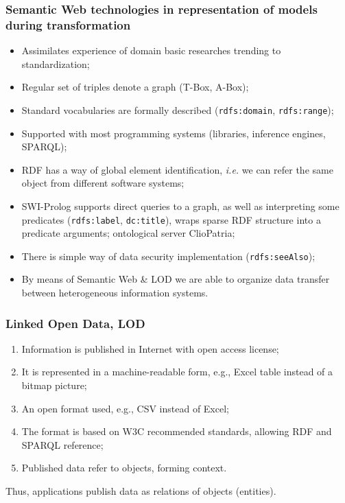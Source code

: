 \documentclass[10pt]{beamer}
\begin{document}
\begin{frame}[fragile]
  \frametitle{Semantic Web technologies in representation of models
    during transformation}
  \begin{itemize}
  \item Assimilates experience of domain basic researches trending to standardization;
  \item Regular set of triples denote a graph (T-Box, A-Box);
  \item Standard vocabularies are formally described (\verb|rdfs:domain|, \verb|rdfs:range|);
  \item Supported with most programming systems (libraries, inference engines, SPARQL);
  \item RDF has a way of global element identification, \emph{i.e.} we can refer the same object from different software systems;
  \item SWI-Prolog supports direct queries to a graph, as well as interpreting some predicates (\verb|rdfs:label|, \verb|dc:title|), wraps sparse RDF structure into a predicate arguments; ontological server ClioPatria;
  \item There is simple way of data security implementation (\verb|rdfs:seeAlso|);
  \item By means of Semantic Web \& LOD we are able to organize data transfer between heterogeneous information systems.
  \end{itemize}
\end{frame}
\begin{frame}
  \frametitle{Linked Open Data, LOD}
  \begin{enumerate}
  \item Information is published in Internet with open access license;
  \item It is represented in a machine-readable form, e.g., Excel table instead of a bitmap picture;
  \item An open format used, e.g., CSV instead of Excel;
  \item The format is based on W3C recommended standards, allowing RDF and SPARQL reference;
  \item Published data refer to objects, forming context.
  \end{enumerate}
  Thus, applications publish data as relations of objects (entities).
\end{frame}
\end{document}
